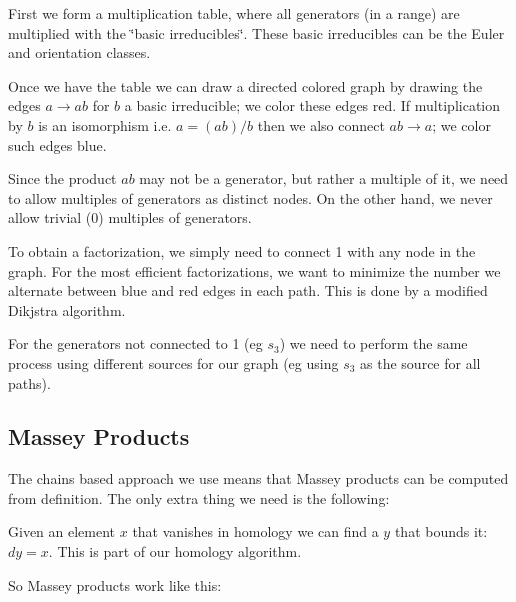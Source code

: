 \begin{DoxyItemize}
\item First we form a multiplication table, where all generators (in a range) are multiplied with the \char`\"{}basic irreducibles\char`\"{}. These basic irreducibles can be the Euler and orientation classes.
\item Once we have the table we can draw a directed colored graph by drawing the edges $a\to ab$ for $b$ a basic irreducible; we color these edges red. If multiplication by $b$ is an isomorphism i.\+e. $a=(ab)/b$ then we also connect $ab\to a$; we color such edges blue.
\item Since the product $ab$ may not be a generator, but rather a multiple of it, we need to allow multiples of generators as distinct nodes. On the other hand, we never allow trivial (0) multiples of generators.
\item To obtain a factorization, we simply need to connect 1 with any node in the graph. For the most efficient factorizations, we want to minimize the number we alternate between blue and red edges in each path. This is done by a modified Dikjstra algorithm.
\item For the generators not connected to 1 (eg $s_3$) we need to perform the same process using different sources for our graph (eg using $s_3$ as the source for all paths).
\end{DoxyItemize}\hypertarget{math_Mass}{}\subsection{Massey Products}\label{math_Mass}
The chains based approach we use means that Massey products can be computed from definition. The only extra thing we need is the following\+:


\begin{DoxyItemize}
\item Given an element $x$ that vanishes in homology we can find a $y$ that bounds it\+: $dy=x$. This is part of our homology algorithm.
\end{DoxyItemize}

So Massey products work like this\+:


